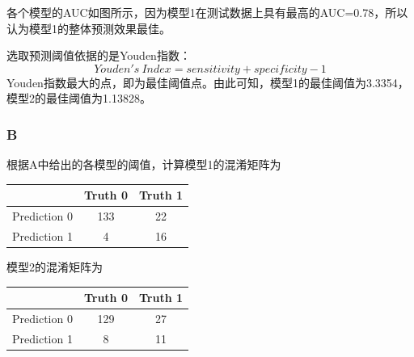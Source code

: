 \documentclass[12pt,a4paper]{article}
\begin{document}
    各个模型的AUC如图所示，因为模型1在测试数据上具有最高的AUC=0.78，所以认为模型1的整体预测效果最佳。\par
    选取预测阈值依据的是Youden指数：
    \begin{equation}
        Youden's\ Index = sensitivity + specificity - 1
    \end{equation}
    Youden指数最大的点，即为最佳阈值点。由此可知，模型1的最佳阈值为3.3354，模型2的最佳阈值为1.13828。
    \subsubsection*{B}
    根据A中给出的各模型的阈值，计算模型1的混淆矩阵为
    \begin{longtable}{|c|c|c|}
        \hline
         & Truth 0 & Truth 1\\
        \hline
        Prediction 0 & 133 & 22\\
        \hline
        Prediction 1 & 4 & 16\\
        \hline
    \end{longtable}
    模型2的混淆矩阵为
    \begin{longtable}{|c|c|c|}
        \hline
         & Truth 0 & Truth 1\\
        \hline
        Prediction 0 & 129 & 27\\
        \hline
        Prediction 1 & 8 & 11\\
        \hline
    \end{longtable}
\end{document}
